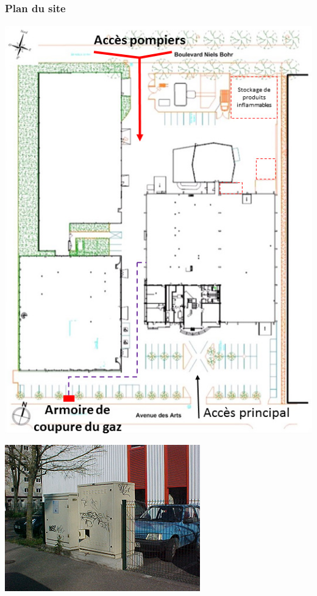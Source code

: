 \documentclass[hidelinks, paper=a4, fontsize=13pt]{report}
\begin{document}
\subsubsection{Plan du site}

\begin{center}
	\includegraphics[scale=0.8]{Annexes/Plans/planCetiat}
\end{center}

\begin{center}
	\includegraphics[scale=0.8]{Annexes/Images/coupureGazCetiat}
\end{center}
\end{document}

